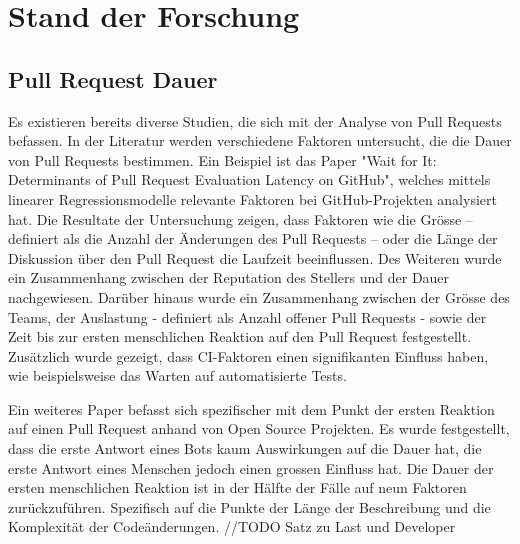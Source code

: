 


\chapter{Stand der Forschung} %

\label{Chapter3} %


\section{Pull Request Dauer}
Es existieren bereits diverse Studien, die sich mit der Analyse von Pull Requests befassen. In der Literatur werden verschiedene Faktoren untersucht, die die Dauer von Pull Requests bestimmen. Ein Beispiel ist das Paper "Wait for It: Determinants of Pull Request Evaluation Latency on GitHub", welches  mittels linearer Regressionsmodelle relevante Faktoren bei GitHub-Projekten analysiert hat. Die Resultate der Untersuchung zeigen, dass Faktoren wie die Grösse – definiert als die Anzahl der Änderungen des Pull Requests – oder die Länge der Diskussion über den Pull Request die Laufzeit beeinflussen. Des Weiteren wurde ein Zusammenhang zwischen der Reputation des Stellers und der Dauer nachgewiesen. Darüber hinaus wurde ein Zusammenhang zwischen der Grösse des Teams, der Auslastung - definiert als Anzahl offener Pull Requests - sowie der Zeit bis zur ersten menschlichen Reaktion auf den Pull Request festgestellt. Zusätzlich wurde gezeigt, dass CI-Faktoren einen signifikanten Einfluss haben, wie beispielsweise das Warten auf automatisierte Tests. \parencite{yu_wait_2015}

Ein weiteres Paper befasst sich spezifischer mit dem Punkt der ersten Reaktion auf einen Pull Request anhand von Open Source Projekten. Es wurde festgestellt, dass die erste Antwort eines Bots kaum Auswirkungen auf die Dauer hat, die erste Antwort eines Menschen jedoch einen grossen Einfluss hat. Die Dauer der ersten menschlichen Reaktion ist in der Hälfte der Fälle auf neun Faktoren zurückzuführen. Spezifisch auf die Punkte der Länge der Beschreibung und die Komplexität der Codeänderungen. //TODO Satz zu Last und Developer \parencite{hasan_understanding_2023} 

